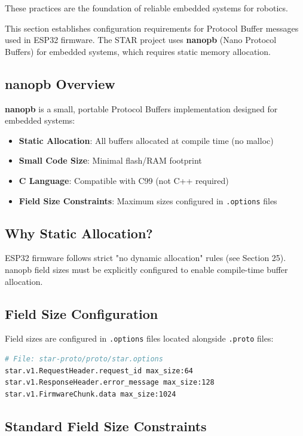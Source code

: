 These practices are the foundation of reliable embedded systems for robotics.


This section establishes configuration requirements for Protocol Buffer messages used in ESP32 firmware. The STAR project uses \textbf{nanopb} (Nano Protocol Buffers) for embedded systems, which requires static memory allocation.

\subsection{nanopb Overview}

\textbf{nanopb} is a small, portable Protocol Buffers implementation designed for embedded systems:

\begin{itemize}
  \item \textbf{Static Allocation}: All buffers allocated at compile time (no malloc)
  \item \textbf{Small Code Size}: Minimal flash/RAM footprint
  \item \textbf{C Language}: Compatible with C99 (not C++ required)
  \item \textbf{Field Size Constraints}: Maximum sizes configured in \texttt{.options} files
\end{itemize}

\subsection{Why Static Allocation?}

ESP32 firmware follows strict "no dynamic allocation" rules (see Section 25). nanopb field sizes must be explicitly configured to enable compile-time buffer allocation.

\subsection{Field Size Configuration}

Field sizes are configured in \texttt{.options} files located alongside \texttt{.proto} files:

\begin{lstlisting}[language=bash]
# File: star-proto/proto/star.options
star.v1.RequestHeader.request_id max_size:64
star.v1.ResponseHeader.error_message max_size:128
star.v1.FirmwareChunk.data max_size:1024


\end{lstlisting}
\subsection{Standard Field Size Constraints}

